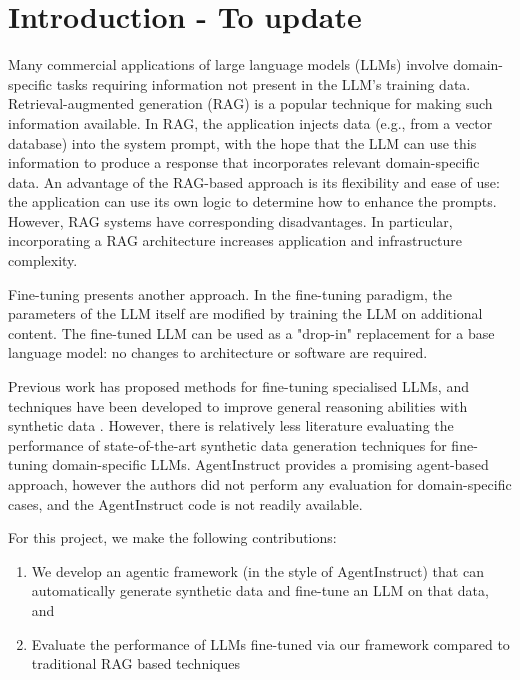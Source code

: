\section{Introduction - To update}
Many commercial applications of large language models (LLMs) involve
domain-specific tasks requiring information not present in the LLM’s
training data. Retrieval-augmented generation (RAG)
\citep{lewis_retrieval-augmented_2020} is a popular technique for making such
information available. In RAG, the application injects data (e.g., from a
vector database) into the system prompt, with the hope that the LLM can use this
information to produce a response that incorporates relevant domain-specific
data. An advantage of the RAG-based approach is its flexibility and ease of use:
the application can use its own logic to determine how to enhance the prompts.
However, RAG systems have corresponding disadvantages. In particular,
incorporating a RAG architecture increases application and infrastructure
complexity.

Fine-tuning presents another approach. In the fine-tuning paradigm, the parameters of the LLM itself are modified by training the LLM on additional content. The fine-tuned LLM can be used as a "drop-in" replacement for a base language model: no changes to architecture or software are required.

Previous work \citep{balaguer_rag_2024,yang_fingpt_2023,wu_pmc-llama_2023} has
proposed methods for fine-tuning specialised LLMs, and techniques have been
developed to improve general reasoning abilities with synthetic data
\citep{shao_synthetic_2023,wang_self-instruct_2023}. However, there is
relatively less literature evaluating the performance of state-of-the-art
synthetic data generation techniques for fine-tuning domain-specific LLMs.
AgentInstruct \citep{mitra_agentinstruct_2024} provides a promising agent-based
approach, however the authors did not perform any evaluation for domain-specific
cases, and the AgentInstruct code is not readily available.

For this project, we make the following contributions:

\begin{enumerate}
\item We develop an agentic framework (in the style of AgentInstruct) that can
automatically generate synthetic data and fine-tune an LLM on that data, and
\item Evaluate the performance of LLMs fine-tuned via our framework compared to
traditional RAG based techniques
\end{enumerate}
